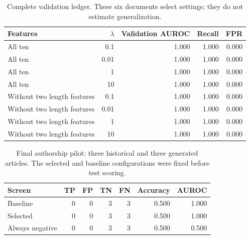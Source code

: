 \begin{table}[htbp]
\centering\small
\begin{tabular}{lrrrr}
\toprule
Features & $\lambda$ & Validation AUROC & Recall & FPR \\
\midrule
All ten & 0.1 & 1.000 & 1.000 & 0.000 \\
All ten & 0.01 & 1.000 & 1.000 & 0.000 \\
All ten & 1 & 1.000 & 1.000 & 0.000 \\
All ten & 10 & 1.000 & 1.000 & 0.000 \\
Without two length features & 0.1 & 1.000 & 1.000 & 0.000 \\
Without two length features & 0.01 & 1.000 & 1.000 & 0.000 \\
Without two length features & 1 & 1.000 & 1.000 & 0.000 \\
Without two length features & 10 & 1.000 & 1.000 & 0.000 \\
\bottomrule
\end{tabular}
\caption{Complete validation ledger. These six documents select settings; they do not estimate generalization.}
\end{table}
\begin{table}[htbp]
\centering\small
\begin{tabular}{lrrrrrr}
\toprule
Screen & TP & FP & TN & FN & Accuracy & AUROC \\
\midrule
Baseline & 0 & 0 & 3 & 3 & 0.500 & 1.000 \\
Selected & 0 & 0 & 3 & 3 & 0.500 & 1.000 \\
Always negative & 0 & 0 & 3 & 3 & 0.500 & 0.500 \\
\bottomrule
\end{tabular}
\caption{Final authorship pilot: three historical and three generated articles. The selected and baseline configurations were fixed before test scoring.}
\end{table}